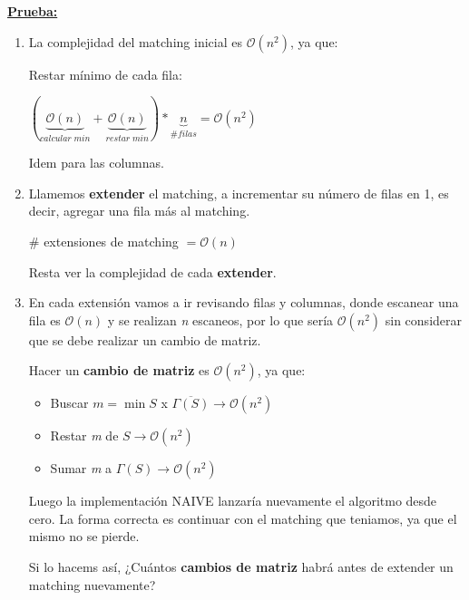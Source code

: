 \documentclass[12pt,a4paper]{report}
\begin{document}
		\textbf{\underline{Prueba:}}
			\begin{enumerate}
				\item La complejidad del matching inicial es $\mathcal{O}(n^{2})$, ya que:
					\par Restar mínimo de cada fila:
					\begin{center}
						$(\underbrace{\mathcal{O}(n)}_{calcular \; min} + \underbrace{\mathcal{O}(n)}_{restar \; min}) * \underbrace{n}_{\# filas} = \mathcal{O}(n^{2})$
					\end{center}
					\par Idem para las columnas.
				\item Llamemos \textbf{extender} el matching, a incrementar su número de filas en 1, es decir, agregar una fila más al matching.
					\begin{center}
						$\#$ extensiones de matching $= \mathcal{O}(n)$
					\end{center}

					\par Resta ver la complejidad de cada \textbf{extender}.
				\item En cada extensión vamos a ir revisando filas y columnas, donde escanear una fila es $\mathcal{O}(n)$ y se realizan \textit{n} escaneos, por lo que sería $\mathcal{O}(n^{2})$ sin considerar que se debe realizar un cambio de matriz.
					\par Hacer un \textbf{cambio de matriz} es $\mathcal{O}(n^{2})$, ya que:
					\begin{itemize}
						\item Buscar $\textit{m} = \min S$ x $\overline{\Gamma(S)} \rightarrow \mathcal{O}(n^{2})$
						\item Restar \textit{m} de $S \rightarrow \mathcal{O}(n^{2})$
						\item Sumar \textit{m} a $\Gamma(S) \rightarrow \mathcal{O}(n^{2})$
					\end{itemize}

					\par Luego la implementación NAIVE lanzaría nuevamente el algoritmo desde cero. La forma correcta es continuar con el matching que teniamos, ya que el mismo no se pierde.
					\par Si lo hacems así, ¿Cuántos \textbf{cambios de matriz} habrá antes de extender un matching nuevamente?


\end{enumerate}
\end{document}
